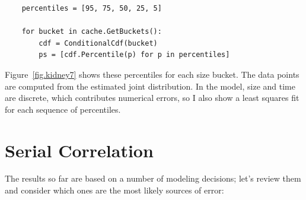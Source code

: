 \documentclass[12pt]{book}
\begin{document}
\begin{verbatim}
    percentiles = [95, 75, 50, 25, 5]

    for bucket in cache.GetBuckets():
        cdf = ConditionalCdf(bucket)      
        ps = [cdf.Percentile(p) for p in percentiles]
\end{verbatim}

Figure~\ref{fig.kidney7} shows these percentiles for each
size bucket.  The data points are computed from the estimated
joint distribution.  In the model, size and time are discrete,
which contributes numerical errors, so I also show a least 
squares fit for each sequence of percentiles.


\section{Serial Correlation}
\label{serial}

The results so far are based on a number of modeling decisions;
let's review them and consider which ones are the most
likely sources of error:
\end{document}
